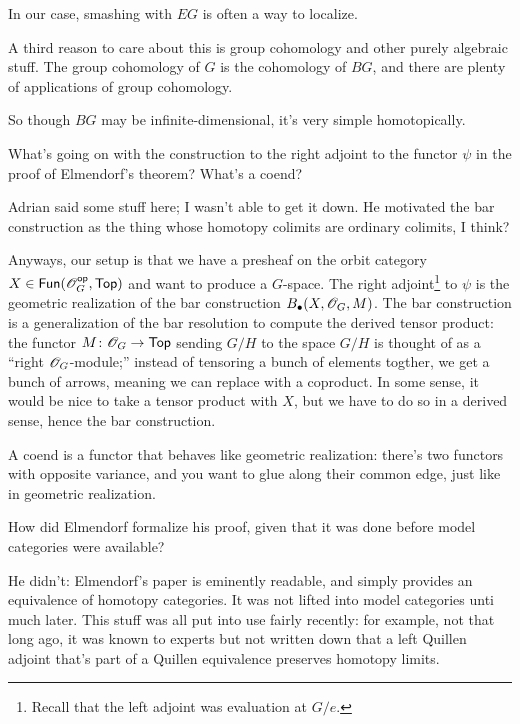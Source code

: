 In our case, smashing with $EG$ is often a way to localize.

A third reason to care about this is group cohomology
and other purely algebraic stuff. The group cohomology of $G$ is the cohomology of $BG$, and there are plenty of
applications of group cohomology.

So though $BG$ may be infinite-dimensional, it's very simple homotopically.
\begin{ques}
What's going on with the construction to the right adjoint to the functor $\psi$ in the proof of Elmendorf's
theorem? What's a coend?
\end{ques}
Adrian said some stuff here; I wasn't able to get it down. He motivated the bar construction as the thing whose
homotopy colimits are ordinary colimits, I think?

Anyways, our setup is that we have a presheaf on the orbit category $X\in\mathsf{Fun}(\mathscr O_G^{\mathsf{op}},\mathsf{Top})$ and want to produce a
$G$-space. The right adjoint\footnote{Recall that the left adjoint was evaluation at $G/e$.} to $\psi$ is the
geometric realization of the bar construction $B_\bullet(X,\mathscr O_G,M)$. The bar construction is a generalization of
the bar resolution to compute the derived tensor product: the functor $M\colon \mathscr O_G\to\mathsf{Top}$ sending $G/H$ to the
space $G/H$ is thought of as a ``right $\mathscr O_G$-module;'' instead of tensoring a bunch of elements togther, we get a
bunch of arrows, meaning we can replace with a coproduct. In some sense, it would be nice to take a tensor product
with $X$, but we have to do so in a derived sense, hence the bar construction.

A coend is a functor that behaves like geometric realization: there's two functors with opposite variance, and you
want to glue along their common edge, just like in geometric realization.
\begin{ques}
How did Elmendorf formalize his proof, given that it was done before model categories were available?
\end{ques}
He didn't: Elmendorf's paper is eminently readable, and simply provides an equivalence of homotopy categories. It
was not lifted into model categories unti much later. This stuff was all put into use fairly recently: for example,
not that long ago, it was known to experts but not written down that a left Quillen adjoint that's part of a
Quillen equivalence preserves homotopy limits.

